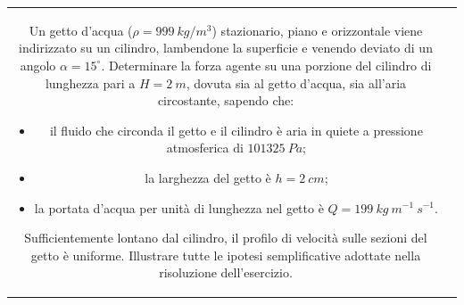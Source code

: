 
\noindent
\begin{tabular}{cc}
\begin{minipage}{0.60\textwidth}
\begin{exerciseS}
Un getto d'acqua ($\rho=999\ kg/m^3$) stazionario, piano e orizzontale 
viene indirizzato su un cilindro, lambendone la superficie e
venendo deviato di un angolo $\alpha =15^\circ$.
Determinare la forza agente su una porzione del cilindro di lunghezza 
pari a $H = 2\ m$, dovuta sia al getto d'acqua,
sia all'aria circostante, sapendo che:
\begin{itemize}
  \item il fluido che circonda il getto e il cilindro \`e aria in quiete a
  pressione atmosferica di $101325\ Pa$;
  \item la larghezza del getto \`e $h=2\ cm$;
  \item la portata d'acqua per unit\`a di lunghezza nel getto \`e 
  $Q = 199\ kg\ m^{-1}\ s^{-1}$.
\end{itemize}
Sufficientemente lontano dal cilindro, il profilo di velocità sulle sezioni del getto è uniforme. Illustrare tutte le ipotesi semplificative adottate nella risoluzione dell'esercizio.


\end{exerciseS}
\end{minipage}
\end{tabular}

